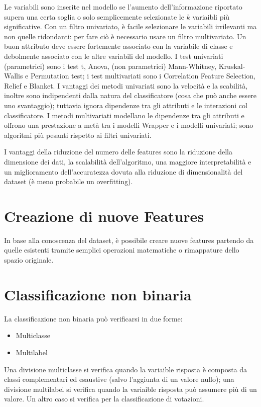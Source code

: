 \documentclass[11pt, a4page, twocolumn]{article}
\begin{document}
Le variabili sono inserite nel modello se l'aumento dell'informazione riportato supera una certa soglia o solo semplicemente selezionate le $k$ variaibli più significative. \newline
Con un filtro univariato, è facile selezionare le variabili irrilevanti ma non quelle ridondanti: per fare ciò è necessario usare un filtro multivariato.
Un buon attributo deve essere fortemente associato con la variabile di classe e debolmente associato con le altre variabili del modello. \newline
I test univariati (parametrici) sono i test t, Anova, (non parametrici) Mann-Whitney, Kruskal-Wallis e Permutation test; i test multivariati sono i Correlation Feature Selection, Relief e Blanket. \newline
I vantaggi dei metodi univariati sono la velocità e la scabilità, inoltre sono indipendenti dalla natura del classificatore (cosa che può anche essere uno svantaggio); tuttavia ignora dipendenze tra gli attributi e le interazioni col classificatore. \newline
I metodi multivariati modellano le dipendenze tra gli attributi e offrono una prestazione a metà tra i modelli Wrapper e i modelli univariati; sono algoritmi più pesanti rispetto ai filtri univariati. \newline

I vantaggi della riduzione del numero delle features sono la riduzione della dimensione dei dati, la scalabilità dell'algoritmo, una maggiore interpretabilità e un miglioramento dell'accuratezza dovuta alla riduzione di dimensionalità del dataset (è meno probabile un overfitting). \newline


\section{Creazione di nuove Features}
In base alla conoscenza del dataset, è possibile creare nuove features partendo da quelle esistenti tramite semplici operazioni matematiche o rimappature dello spazio originale. \newline


\section{Classificazione non binaria}
La classificazione non binaria può verificarsi in due forme:
\begin{itemize}
  \item Multiclasse
  \item Multilabel
\end{itemize}
Una divisione multiclasse si verifica quando la variaible risposta è composta da classi complementari ed esaustive (salvo l'aggiunta di un valore nullo); una divisione multilabel si verifica quando la variaible risposta può assumere più di un valore.
Un altro caso si verifica per la classificazione di votazioni. \newline
\end{document}
